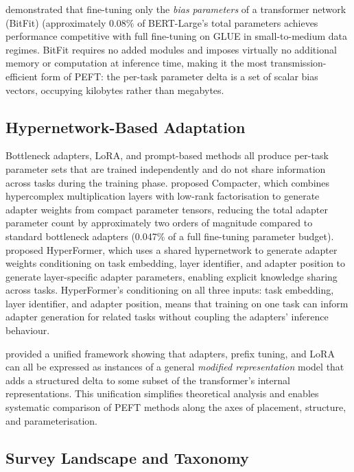\citet{BenZaken2022} demonstrated that fine-tuning only the \textit{bias parameters}
of a transformer network (BitFit) (approximately 0.08\% of BERT-Large's total
parameters achieves performance competitive with full fine-tuning on GLUE in small-to-medium data regimes.
BitFit requires no added modules and imposes virtually no additional memory or computation
at inference time, making it the most transmission-efficient form of PEFT: the per-task
parameter delta is a set of scalar bias vectors, occupying kilobytes rather than
megabytes.

\subsection{Hypernetwork-Based Adaptation}
\label{sec:peft:hypernetwork}

Bottleneck adapters, LoRA, and prompt-based methods all produce per-task parameter sets
that are trained independently and do not share information across tasks during the
training phase. \citet{MahabadiCompacter2021} proposed Compacter, which combines
hypercomplex multiplication layers with low-rank factorisation to generate adapter weights
from compact parameter tensors, reducing the total adapter parameter count by approximately two orders of magnitude
compared to standard bottleneck adapters (0.047\% of a full fine-tuning parameter budget).
\citet{Mahabadi2021} proposed HyperFormer, which uses a shared hypernetwork
to generate adapter weights conditioning on task embedding, layer identifier, and adapter
position to generate layer-specific adapter parameters, enabling explicit knowledge
sharing across tasks. HyperFormer's conditioning on all three inputs: task embedding,
layer identifier, and adapter position, means that training on one task
can inform adapter generation for related tasks without coupling the adapters' inference
behaviour.

\citet{HeUnifiedPEFT2022} provided a unified framework showing that adapters, prefix
tuning, and LoRA can all be expressed as instances of a general \textit{modified
representation} model that adds a structured delta to some subset of the
transformer's internal representations. This unification simplifies theoretical analysis
and enables systematic comparison of PEFT methods along the axes of placement, structure,
and parameterisation.

\subsection{Survey Landscape and Taxonomy}
\label{sec:peft:taxonomy}

